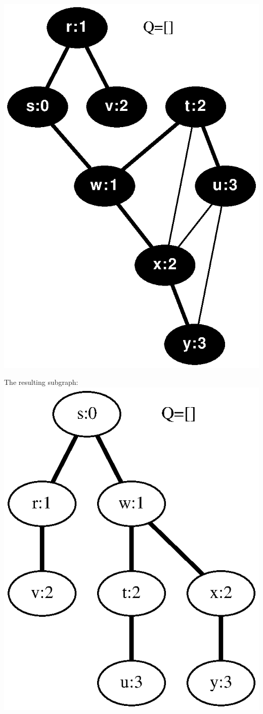 \documentclass{article}
\begin{document}
\includegraphics[width=0.22727272727272727\linewidth]{clrs_example_bfs_08.eps}
\vspace{1em}
\begin{minipage}{0.22727272727272727\linewidth}
The resulting subgraph: 
\includegraphics[width=\linewidth]{clrs_example_bfs_09.eps}
\end{minipage}
\end{document}
